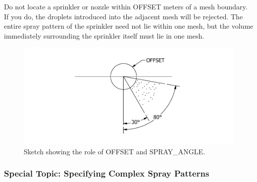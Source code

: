 \documentclass[11pt]{book}
\begin{document}
Do not locate a sprinkler or nozzle within {\ct OFFSET} meters of a mesh boundary. If you do, the droplets introduced into the adjacent mesh will be rejected. The entire spray pattern of the sprinkler need not lie within one mesh, but the volume immediately surrounding the sprinkler itself must lie in one mesh.

\begin{figure}[ht]
\includegraphics[width=6.5in]{FIGURES/Sprinkler_Sketch}
\caption[Sketch of sprinkler spray]{Sketch showing the role of {\ct OFFSET} and {\ct SPRAY\_ANGLE}.}
\label{Sprinkler_Sketch}
\end{figure}


\subsubsection{Special Topic: Specifying Complex Spray Patterns}
\label{info:spraypattern}
\label{info:TABL}
\label{bucket_test_2}
\end{document}
